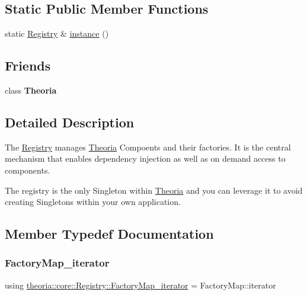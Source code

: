 \subsection*{Static Public Member Functions}
\begin{DoxyCompactItemize}
\item 
static \hyperlink{classtheoria_1_1core_1_1Registry}{Registry} \& \hyperlink{classtheoria_1_1core_1_1Registry_ac36dbf9ae74e19b9fe30f57910e3d93a}{instance} ()
\end{DoxyCompactItemize}
\subsection*{Friends}
\begin{DoxyCompactItemize}
\item 
\mbox{\label{classtheoria_1_1core_1_1Registry_a03f09b9a4f49119b0c16c42ded7cba64}} 
class {\bfseries Theoria}
\end{DoxyCompactItemize}


\subsection{Detailed Description}
The \hyperlink{classtheoria_1_1core_1_1Registry}{Registry} manages \hyperlink{classtheoria_1_1core_1_1Theoria}{Theoria} Compoents and their factories. It is the central mechanism that enables dependency injection as well as on demand access to components.

The registry is the only Singleton within \hyperlink{classtheoria_1_1core_1_1Theoria}{Theoria} and you can leverage it to avoid creating Singletons within your own application. 

\subsection{Member Typedef Documentation}
\mbox{\label{classtheoria_1_1core_1_1Registry_ae131721f32d396fad4d2d48b0438dca1}} 
\subsubsection{\texorpdfstring{Factory\+Map\+\_\+iterator}{FactoryMap\_iterator}}
{\footnotesize\ttfamily using \hyperlink{classtheoria_1_1core_1_1Registry_ae131721f32d396fad4d2d48b0438dca1}{theoria\+::core\+::\+Registry\+::\+Factory\+Map\+\_\+iterator} =  Factory\+Map\+::iterator}

